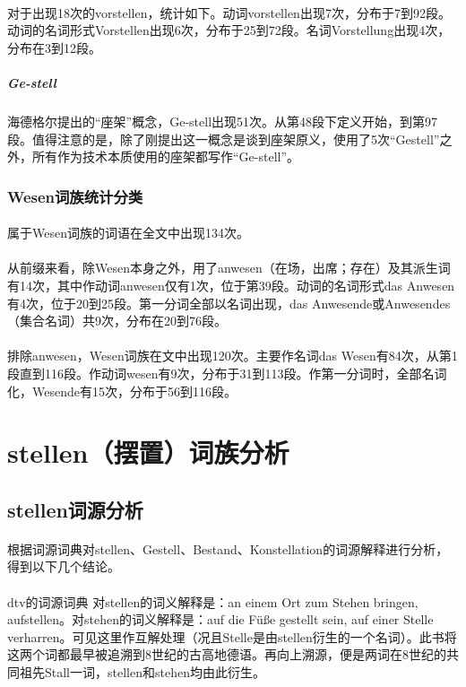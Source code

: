 \documentclass{article}
\begin{document}
			\paragraph{}	
对于出现18次的vorstellen，统计如下。动词vorstellen出现7次，分布于7到92段。动词的名词形式Vorstellen出现6次，分布于25到72段。名词Vorstellung出现4次，分布在3到12段。
			\subparagraph{Ge-stell}	
			海德格尔提出的“座架”概念，Ge-stell出现51次。从第48段下定义开始，到第97段。值得注意的是，除了刚提出这一概念是谈到座架原义，使用了5次“Gestell”之外，所有作为技术本质使用的座架都写作“Ge-stell”。
		\subsubsection{Wesen词族统计分类}
			\paragraph{}
			属于Wesen词族的词语在全文中出现134次。
			\paragraph{}
			从前缀来看，除Wesen本身之外，用了anwesen（在场，出席；存在）及其派生词有14次，其中作动词anwesen仅有1次，位于第39段。动词的名词形式das Anwesen有4次，位于20到25段。第一分词全部以名词出现，das Anwesende或Anwesendes（集合名词）共9次，分布在20到76段。
			\paragraph{}
排除anwesen，Wesen词族在文中出现120次。主要作名词das Wesen有84次，从第1段直到116段。作动词wesen有9次，分布于31到113段。作第一分词时，全部名词化，Wesende有15次，分布于56到116段。
\section{stellen（摆置）词族分析} 
	\subsection{stellen词源分析}
		\paragraph{}
		根据词源词典对stellen、Gestell、Bestand、Konstellation的词源解释进行分析，得到以下几个结论。
		\paragraph{}
		dtv的词源词典
		\cite{yellow_etym}对stellen的词义解释是：an einem Ort zum Stehen bringen, aufstellen。对stehen的词义解释是：auf die Füße gestellt sein, auf einer Stelle verharren。可见这里作互解处理（况且Stelle是由stellen衍生的一个名词）。此书将这两个词都最早被追溯到8世纪的古高地德语。再向上溯源，便是两词在8世纪的共同祖先Stall一词，stellen和stehen均由此衍生。
\end{document}
